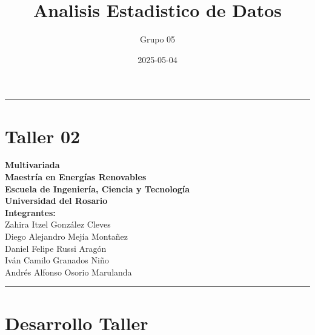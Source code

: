\documentclass[
]{article}
\title{Analisis Estadistico de Datos}
\author{Grupo 05}
\date{2025-05-04}
\begin{document}
\maketitle

{
\setcounter{tocdepth}{2}
\tableofcontents
}
\begin{center}\rule{0.5\linewidth}{0.5pt}\end{center}

\section{Taller 02}\label{taller-02}

\textbf{Multivariada}\\
\textbf{Maestría en Energías Renovables}\\
\textbf{Escuela de Ingeniería, Ciencia y Tecnología}\\
\textbf{Universidad del Rosario}\\
\textbf{Integrantes:}\\
Zahira Itzel González Cleves\\
Diego Alejandro Mejía Montañez\\
Daniel Felipe Russi Aragón\\
Iván Camilo Granados Niño\\
Andrés Alfonso Osorio Marulanda

\begin{center}\rule{0.5\linewidth}{0.5pt}\end{center}

\section{Desarrollo Taller}\label{desarrollo-taller}
\end{document}
